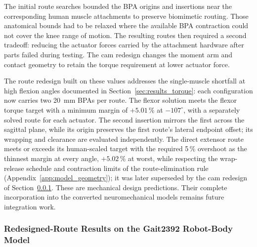 The initial route searches bounded the BPA origins and insertions near the corresponding human muscle attachments to preserve biomimetic routing. Those anatomical bounds had to be relaxed where the available BPA contraction could not cover the knee range of motion. The resulting routes then required a second tradeoff: reducing the actuator forces carried by the attachment hardware after parts failed during testing. The cam redesign changes the moment arm and contact geometry to retain the torque requirement at lower actuator force.

The route redesign built on these values addresses the single-muscle shortfall at high flexion angles documented in Section~\ref{sec:results_torque}: each configuration now carries two \qty{20}{\mm} BPAs per route. The flexor solution meets the flexor torque target with a minimum margin of $+5.01$\,\% at $-107^{\circ}$, with a separately solved route for each actuator. The second insertion mirrors the first across the sagittal plane, while its origin preserves the first route's lateral endpoint offset; its wrapping and clearance are evaluated independently. The direct extensor route meets or exceeds its human-scaled target with the required 5\,\% overshoot as the thinnest margin at every angle, $+5.02$\,\% at worst, while respecting the wrap-release schedule and contraction limits of the route-elimination rule (Appendix~\ref{app:model_geometry}); it was later superseded by the cam redesign of Section~\ref{sec:route_redesign_results}. These are mechanical design predictions. Their complete incorporation into the converted neuromechanical models remains future integration work.

\subsubsection{Redesigned-Route Results on the Gait2392 Robot-Body Model}\label{sec:route_redesign_results}

